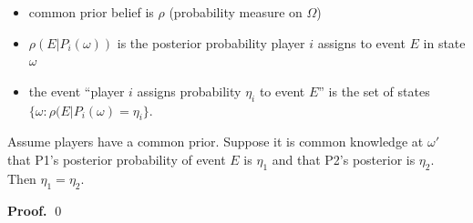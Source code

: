 \documentclass{beamer}    %
\newcommand{\Lra}{\Leftrightarrow}
\theoremstyle{plain}
\theoremstyle{definition}
\begin{document}
{  \begin{itemize}
  \item common prior belief is $\rho$ (probability measure on $\Omega$)
  \item $\rho(E|P_i(\omega))$ is the posterior probability player $i$ assigns to event $E$ in state $\omega$
  \item the event ``player $i$ assigns probability $\eta_i$ to event $E$'' is the set of states $\{\omega: \rho(E|P_i(\omega)=\eta_i\}$.
  \end{itemize}

\framebreak

\begin{theorem}[Aumann 1976]
 Assume players have a common prior. Suppose it is common knowledge at $\omega'$ that P1's posterior probability of event $E$ is $\eta_1$ and that P2's posterior is $\eta_2$. Then $\eta_1=\eta_2$.
\end{theorem}
\textbf{Proof. }
\qed

\framebreak

}
\end{document}
